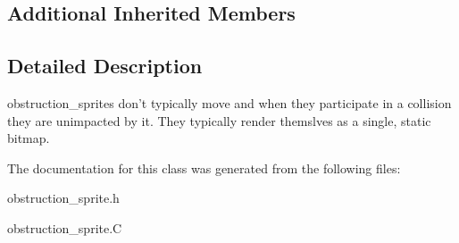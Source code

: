 \subsection*{Additional Inherited Members}


\subsection{Detailed Description}
obstruction\-\_\-sprites don't typically move and when they participate in a collision they are unimpacted by it. They typically render themslves as a single, static bitmap. 

The documentation for this class was generated from the following files\-:\begin{DoxyCompactItemize}
\item 
obstruction\-\_\-sprite.\-h\item 
obstruction\-\_\-sprite.\-C\end{DoxyCompactItemize}
